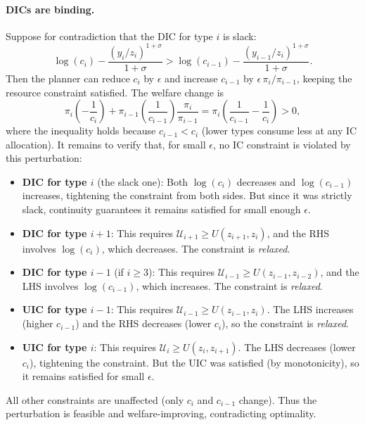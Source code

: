 \documentclass[12pt,a4paper]{article}
\theoremstyle{definition}
\theoremstyle{plain}
\theoremstyle{remark}
\newcommand{\calU}{\mathcal{U}}
\begin{document}
\paragraph{DICs are binding.}
Suppose for contradiction that the DIC for type $i$ is slack:
\[
  \log(c_i) - \frac{(y_i/z_i)^{1+\sigma}}{1+\sigma} > \log(c_{i-1}) - \frac{(y_{i-1}/z_i)^{1+\sigma}}{1+\sigma}.
\]
Then the planner can reduce $c_i$ by $\epsilon$ and increase $c_{i-1}$ by $\epsilon\,\pi_i/\pi_{i-1}$, keeping the resource constraint satisfied. The welfare change is
\[
  \pi_i\!\left(-\frac{1}{c_i}\right) + \pi_{i-1}\!\left(\frac{1}{c_{i-1}}\right)\frac{\pi_i}{\pi_{i-1}} = \pi_i\!\left(\frac{1}{c_{i-1}} - \frac{1}{c_i}\right) > 0,
\]
where the inequality holds because $c_{i-1} < c_i$ (lower types consume less at any IC allocation). It remains to verify that, for small $\epsilon$, no IC constraint is violated by this perturbation:
\begin{itemize}[leftmargin=2em]
  \item \textbf{DIC for type $i$} (the slack one): Both $\log(c_i)$ decreases and $\log(c_{i-1})$ increases, tightening the constraint from both sides. But since it was strictly slack, continuity guarantees it remains satisfied for small enough $\epsilon$.
  \item \textbf{DIC for type $i+1$}: This requires $\calU_{i+1} \geq U(z_{i+1}, z_i)$, and the RHS involves $\log(c_i)$, which decreases. The constraint is \emph{relaxed}.
  \item \textbf{DIC for type $i-1$} (if $i \geq 3$): This requires $\calU_{i-1} \geq U(z_{i-1}, z_{i-2})$, and the LHS involves $\log(c_{i-1})$, which increases. The constraint is \emph{relaxed}.
  \item \textbf{UIC for type $i-1$}: This requires $\calU_{i-1} \geq U(z_{i-1}, z_i)$. The LHS increases (higher $c_{i-1}$) and the RHS decreases (lower $c_i$), so the constraint is \emph{relaxed}.
  \item \textbf{UIC for type $i$}: This requires $\calU_i \geq U(z_i, z_{i+1})$. The LHS decreases (lower $c_i$), tightening the constraint. But the UIC was satisfied (by monotonicity), so it remains satisfied for small $\epsilon$.
\end{itemize}
All other constraints are unaffected (only $c_i$ and $c_{i-1}$ change). Thus the perturbation is feasible and welfare-improving, contradicting optimality.
\end{document}
